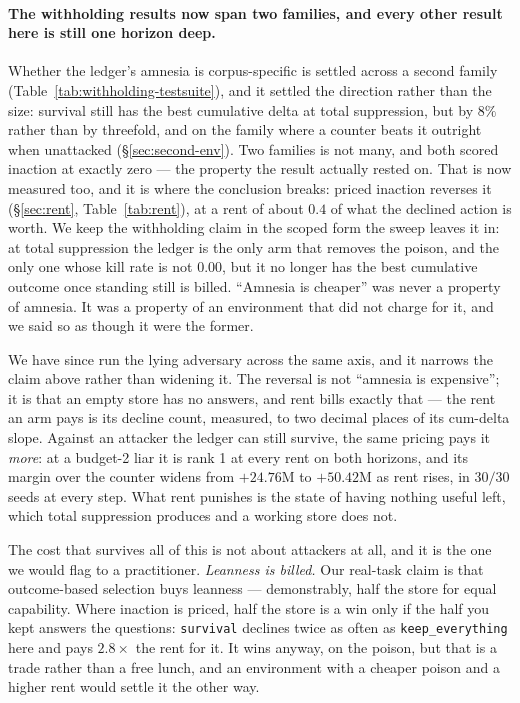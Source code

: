 \paragraph{The withholding results now span two families, and every
other result here is still one horizon deep.} Whether the ledger's
amnesia is corpus-specific is settled across a second family
(Table~\ref{tab:withholding-testsuite}), and it settled the
direction rather than the size: survival still has the best cumulative
delta at total suppression, but by $8\%$ rather than by threefold, and
on the family where a counter beats it outright when unattacked
(\S\ref{sec:second-env}). Two families is not many, and both scored
inaction at exactly zero --- the property the result actually rested on.
That is now measured too, and it is where the conclusion breaks: priced
inaction reverses it (\S\ref{sec:rent}, Table~\ref{tab:rent}), at a rent
of about $0.4$ of what the declined action is worth. We keep the
withholding claim in the scoped form the sweep leaves it in: at total
suppression the ledger is the only arm that removes the poison, and the
only one whose kill rate is not $0.00$, but it no longer has the best
cumulative outcome once standing still is billed. ``Amnesia is cheaper''
was never a property of amnesia. It was a property of an environment
that did not charge for it, and we said so as though it were the former.

We have since run the lying adversary across the same axis, and it
narrows the claim above rather than widening it. The reversal is not
``amnesia is expensive''; it is that an empty store has no answers, and
rent bills exactly that --- the rent an arm pays is its decline count,
measured, to two decimal places of its cum-delta slope. Against an
attacker the ledger can still survive, the same pricing pays it
\emph{more}: at a budget-2 liar it is rank 1 at every rent on both
horizons, and its margin over the counter widens from $+24.76$M to
$+50.42$M as rent rises, in $30/30$ seeds at every step. What rent
punishes is the state of having nothing useful left, which total
suppression produces and a working store does not.

The cost that survives all of this is not about attackers at all, and it
is the one we would flag to a practitioner. \emph{Leanness is billed.}
Our real-task claim is that outcome-based selection buys leanness
--- demonstrably, half the store for equal capability. Where inaction is
priced, half the store is a win only if the half you kept answers the
questions: \texttt{survival} declines twice as often as
\texttt{keep\_everything} here and pays $2.8\times$ the rent for it. It
wins anyway, on the poison, but that is a trade rather than a free
lunch, and an environment with a cheaper poison and a higher rent would
settle it the other way.

